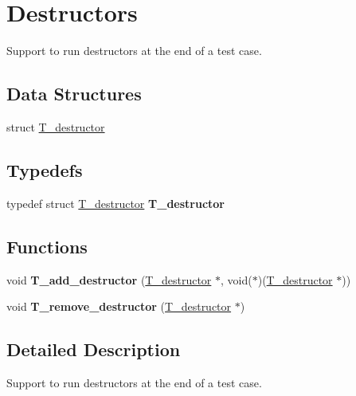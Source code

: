 \hypertarget{group__RTEMSTestFrameworkDestructors}{}\section{Destructors}
\label{group__RTEMSTestFrameworkDestructors}


Support to run destructors at the end of a test case.  


\subsection*{Data Structures}
\begin{DoxyCompactItemize}
\item 
struct \mbox{\hyperlink{structT__destructor}{T\+\_\+destructor}}
\end{DoxyCompactItemize}
\subsection*{Typedefs}
\begin{DoxyCompactItemize}
\item 
\mbox{\label{group__RTEMSTestFrameworkDestructors_gac3bd0ebfaa216d9d4c6c35649774def2}} 
typedef struct \mbox{\hyperlink{structT__destructor}{T\+\_\+destructor}} {\bfseries T\+\_\+destructor}
\end{DoxyCompactItemize}
\subsection*{Functions}
\begin{DoxyCompactItemize}
\item 
\mbox{\label{group__RTEMSTestFrameworkDestructors_ga8a6c251d9be17206979f21f229ab97a7}} 
void {\bfseries T\+\_\+add\+\_\+destructor} (\mbox{\hyperlink{structT__destructor}{T\+\_\+destructor}} $\ast$, void($\ast$)(\mbox{\hyperlink{structT__destructor}{T\+\_\+destructor}} $\ast$))
\item 
\mbox{\label{group__RTEMSTestFrameworkDestructors_ga5fd16d0cf2827a2b598426dbb1f52d09}} 
void {\bfseries T\+\_\+remove\+\_\+destructor} (\mbox{\hyperlink{structT__destructor}{T\+\_\+destructor}} $\ast$)
\end{DoxyCompactItemize}


\subsection{Detailed Description}
Support to run destructors at the end of a test case. 

